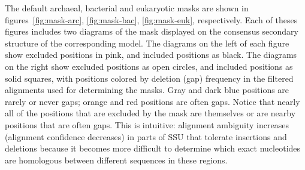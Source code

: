 The default archaeal, bacterial and eukaryotic masks are shown in
figures~\ref{fig:mask-arc}, \ref{fig:mask-bac}, \ref{fig:mask-euk},
respectively. Each of theses figures includes two diagrams of the mask
displayed on the consensus secondary structure of the corresponding
model. The diagrams on the left of each figure show excluded positions
in pink, and included positions as black. The diagrams on the right
show excluded positions as open circles, and included positions as
solid squares, with positions colored by deletion (gap) frequency in
the filtered alignments used for determining the masks. Gray and dark
blue positions are rarely or never gaps; orange and red positions are
often gaps. Notice that nearly all of the positions that are excluded
by the mask are themselves or are nearby positions that are often
gaps. This is intuitive: alignment ambiguity increases (alignment
confidence decreases) in parts of SSU that tolerate insertions and
deletions because it becomes more difficult to determine which
exact nucleotides are homologous between different sequences in these
regions.

